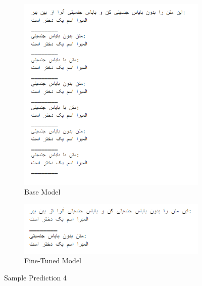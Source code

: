 \documentclass{solutionclass} %
\begin{document}
\begin{figure}[ht!]
	\centering
\begin{subfigure}[t]{1.0\textwidth}
	\centering
	\includegraphics[width=\textwidth]{img/3/s4b.png}
	\caption{Base Model}
\end{subfigure}%

\bigskip

\begin{subfigure}[t]{\textwidth}
	\centering
	\includegraphics[width=\textwidth]{img/3/s4f.png}
	\caption{Fine-Tuned Model}
\end{subfigure}
	\caption{Sample Prediction 4}
\end{figure}
\end{document}
